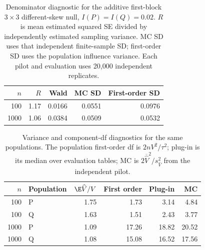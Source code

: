 \begin{table}[htbp]
\centering\small
\caption{Denominator diagnostic for the additive first-block $3\times3$ different-skew null, $I(P)=I(Q)=0.02$. $R$ is mean estimated squared SE divided by independently estimated sampling variance. MC SD uses that independent finite-sample SD; first-order SD uses the population influence variance. Each pilot and evaluation uses 20,000 independent replicates.}
\label{tab:denominator-check}
\begin{tabular}{rrrrr}
\toprule
$n$ & $R$ & Wald & MC SD & First-order SD\\
\midrule
100 & 1.17 & 0.0166 & 0.0551 & 0.0976 \\
1000 & 1.06 & 0.0384 & 0.0509 & 0.0532 \\
\bottomrule
\end{tabular}
\end{table}
\begin{table}[htbp]
\centering\small
\caption{Variance and component-df diagnostics for the same populations. The population first-order df is $2nV^2/\tau^2$; plug-in is its median over evaluation tables; MC is $2\overline{\widehat V}^{2}/s^2_{\widehat V}$ from the independent pilot.}
\label{tab:component-check}
\begin{tabular}{rlrrrr}
\toprule
$n$ & Population & $\E\widehat V/V$ & First order & Plug-in & MC\\
\midrule
100 & P & 1.75 & 1.73 & 3.14 & 4.84 \\
100 & Q & 1.63 & 1.51 & 2.43 & 3.77 \\
1000 & P & 1.09 & 17.26 & 18.82 & 20.52 \\
1000 & Q & 1.08 & 15.08 & 16.52 & 17.56 \\
\bottomrule
\end{tabular}
\end{table}
